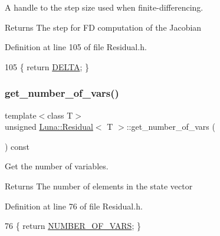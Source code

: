 A handle to the step size used when finite-\/differencing. 

\begin{DoxyReturn}{Returns}
The step for FD computation of the Jacobian 
\end{DoxyReturn}


Definition at line 105 of file Residual.\+h.


\begin{DoxyCode}
105 \{ \textcolor{keywordflow}{return} \hyperlink{classLuna_1_1Residual_a1bf38ddfa149797de560dcb11c975fef}{DELTA}; \}
\end{DoxyCode}
\mbox{\label{classLuna_1_1Residual_aa64479978dfc1879345e5b650881c488}} 
\subsubsection{\texorpdfstring{get\+\_\+number\+\_\+of\+\_\+vars()}{get\_number\_of\_vars()}}
{\footnotesize\ttfamily template$<$class T$>$ \\
unsigned \hyperlink{classLuna_1_1Residual}{Luna\+::\+Residual}$<$ T $>$\+::get\+\_\+number\+\_\+of\+\_\+vars (\begin{DoxyParamCaption}{ }\end{DoxyParamCaption}) const\hspace{0.3cm}{\ttfamily [inline]}}



Get the number of variables. 

\begin{DoxyReturn}{Returns}
The number of elements in the state vector 
\end{DoxyReturn}


Definition at line 76 of file Residual.\+h.


\begin{DoxyCode}
76 \{ \textcolor{keywordflow}{return} \hyperlink{classLuna_1_1Residual_a8e7a52a94a49d900ba2784e621a35668}{NUMBER\_OF\_VARS}; \}
\end{DoxyCode}
\mbox{\label{classLuna_1_1Residual_a866342c8d328177ea3f00c16d929cb0e}} 
